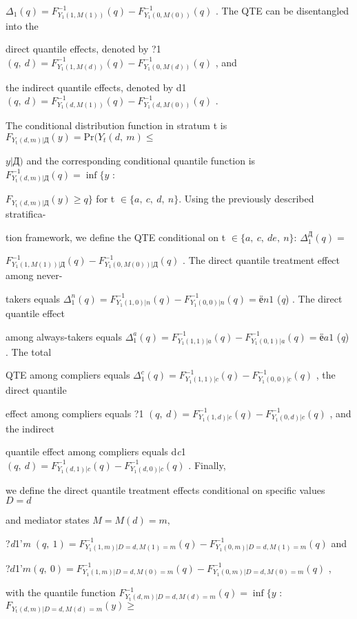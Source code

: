 \documentclass[a4paper,12pt]{article}
\begin{document}
$\Delta_{1}(q) = F_{Y_{1}(1,M(1))}^{-1}(q)-F_{Y_{1}(0,M(0))}^{-1}(q)$ . The QTE can be disentangled into the

direct quantile effects, denoted by ?1 $(q,\ d) = F_{Y_{1}(1,M(d))}^{-1}(q) - F_{Y_{1}(0,M(d))}^{-1}(q)$ , and

the indirect quantile effects, denoted by d1 $(q,\ d) = F_{Y_{1}(d,M(1))}^{-1}(q) -F_{Y_{1}(d,M(0))}^{-1}(q)$ .

The conditional distribution function in stratum t is $F_{Y_{\mathrm{t}}(d,m)|Д}(y) =\mathrm{P}\mathrm{r}(Y_{t}(d,\ m) \leq$

$y|Д)$ and the corresponding conditional quantile function is $F_{Y_{\mathrm{t}}(d,m)|Д}^{-1}(q) = \displaystyle \inf\{y$ :

$F_{Y_{\mathrm{t}}(d,m)|Д}(y) \geq q\}$ for t $\in \{a,\ c,\ d,\ n\}$. Using the previously described stratifica-

tion framework, we define the QTE conditional on t $\in \{a,\ c,\ de,\ n\}$: $\Delta_{1}^{Д}(q) =$

$F_{Y_{1}(1,M(1))|Д}^{-1}(q)-F_{Y_{1}(0,M(0))|Д}^{-1}(q)$ . The direct quantile treatment effect among never-

takers equals $\Delta_{1}^{n}(q)=F_{Y_{1}(1,0)|n}^{-1}(q)-F_{Y_{1}(0,0)|n}^{-1}(q)=ё n1$ ({\it q}) . The direct quantile effect

among always-takers equals $\Delta_{1}^{a}(q) = F_{Y_{1}(1,1)|a}^{-1}(q)-F_{Y_{1}(0,1)|a}^{-1}(q) =ё a1$ ({\it q}) . The total

QTE among compliers equals $\Delta_{1}^{c}(q)=F_{Y_{1}(1,1)|c}^{-1}(q)-F_{Y_{1}(0,0)|c}^{-1}(q)$ , the direct quantile

effect among compliers equals ?1 $(q,\ d) =F_{Y_{1}(1,d)|c}^{-1}(q)-F_{Y_{1}(0,d)|c}^{-1}(q)$ , and the indirect

quantile effect among compliers equals d{\it c}1 $(q,\ d)=F_{Y_{1}(d,1)|c}^{-1}(q)-F_{Y_{1}(d,0)|c}^{-1}(q)$ . Finally,

we define the direct quantile treatment effects conditional on specific values $D=d$

and mediator states $M=M(d)=m,$

?{\it d}1'{\it m} $(q,\ 1)=F_{Y_{1}(1,m)|D=d,M(1)=m}^{-1}(q)-F_{Y_{1}(0,m)|D=d,M(1)=m}^{-1}(q)$ and
\begin{center}
?$d$1'$m (q,\ 0)=F_{Y_{1}(1,m)|D=d,M(0)=m}^{-1}(q)-F_{Y_{1}(0,m)|D=d,M(0)=m}^{-1}(q)$ ,
\end{center}
with the quantile function $F_{Y_{\mathrm{t}}(d,m)|D=d,M(d)=m}^{-1}(q) =\displaystyle \inf\{y$ : $F_{Y_{\mathrm{t}}(d,m)|D=d,M(d)=m}(y) \geq$
\end{document}
